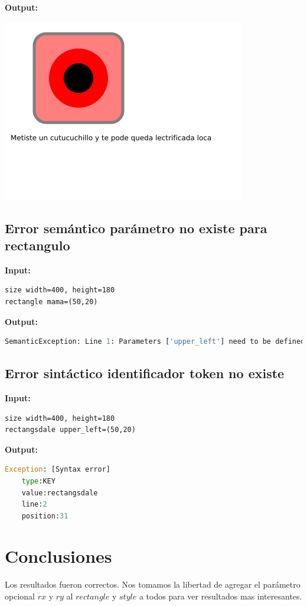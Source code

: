 \documentclass{article}
\theoremstyle{definition}
\theoremstyle{remark}
\begin{document}
\textbf{Output:}

\includegraphics{5.png}

\subsection{Error semántico parámetro no existe para rectangulo}

\textbf{Input:}
\begin{lstlisting}
size width=400, height=180
rectangle mama=(50,20)
\end{lstlisting}

\textbf{Output:}
\begin{lstlisting}[language=Python]
    SemanticException: Line 1: Parameters ['upper_left'] need to be defined for rectangle
\end{lstlisting}

\subsection{Error sintáctico identificador token no existe}

\textbf{Input:}
\begin{lstlisting}
size width=400, height=180
rectangsdale upper_left=(50,20)
\end{lstlisting}

\textbf{Output:}
\begin{lstlisting}[language=Python]
    Exception: [Syntax error]
    type:KEY
    value:rectangsdale
    line:2
    position:31
\end{lstlisting}

\section{Conclusiones}
Los resultados fueron correctos. Nos tomamos la libertad de agregar el parámetro opcional $rx$ y $ry$ al $rectangle$ y $style$ a todos para ver resultados mas interesantes. 
\end{document}
